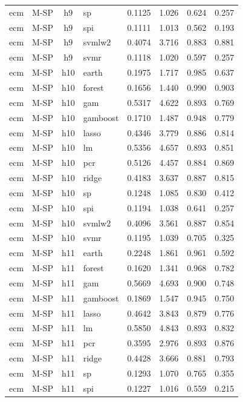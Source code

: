 \begin{ThreePartTable}
\begin{longtable}[t]{llclcccc}
ecm & M-SP & h9 & sp & 0.1125 & 1.026 & 0.624 & 0.257\\
ecm & M-SP & h9 & spi & 0.1111 & 1.013 & 0.562 & 0.193\\
ecm & M-SP & h9 & svmlw2 & 0.4074 & 3.716 & 0.883 & 0.881\\
ecm & M-SP & h9 & svmr & 0.1118 & 1.020 & 0.597 & 0.257\\
\addlinespace
ecm & M-SP & h10 & earth & 0.1975 & 1.717 & 0.985 & 0.637\\
ecm & M-SP & h10 & forest & 0.1656 & 1.440 & 0.990 & 0.903\\
ecm & M-SP & h10 & gam & 0.5317 & 4.622 & 0.893 & 0.769\\
ecm & M-SP & h10 & gamboost & 0.1710 & 1.487 & 0.948 & 0.779\\
ecm & M-SP & h10 & lasso & 0.4346 & 3.779 & 0.886 & 0.814\\
ecm & M-SP & h10 & lm & 0.5356 & 4.657 & 0.893 & 0.851\\
ecm & M-SP & h10 & pcr & 0.5126 & 4.457 & 0.884 & 0.869\\
ecm & M-SP & h10 & ridge & 0.4183 & 3.637 & 0.887 & 0.815\\
ecm & M-SP & h10 & sp & 0.1248 & 1.085 & 0.830 & 0.412\\
ecm & M-SP & h10 & spi & 0.1194 & 1.038 & 0.641 & 0.257\\
ecm & M-SP & h10 & svmlw2 & 0.4096 & 3.561 & 0.887 & 0.854\\
ecm & M-SP & h10 & svmr & 0.1195 & 1.039 & 0.705 & 0.325\\
\addlinespace
ecm & M-SP & h11 & earth & 0.2248 & 1.861 & 0.961 & 0.592\\
ecm & M-SP & h11 & forest & 0.1620 & 1.341 & 0.968 & 0.782\\
ecm & M-SP & h11 & gam & 0.5669 & 4.693 & 0.900 & 0.748\\
ecm & M-SP & h11 & gamboost & 0.1869 & 1.547 & 0.945 & 0.750\\
ecm & M-SP & h11 & lasso & 0.4642 & 3.843 & 0.879 & 0.776\\
ecm & M-SP & h11 & lm & 0.5850 & 4.843 & 0.893 & 0.832\\
ecm & M-SP & h11 & pcr & 0.3595 & 2.976 & 0.893 & 0.876\\
ecm & M-SP & h11 & ridge & 0.4428 & 3.666 & 0.881 & 0.793\\
ecm & M-SP & h11 & sp & 0.1293 & 1.070 & 0.765 & 0.355\\
ecm & M-SP & h11 & spi & 0.1227 & 1.016 & 0.559 & 0.215\\

\end{longtable}
\end{ThreePartTable}

